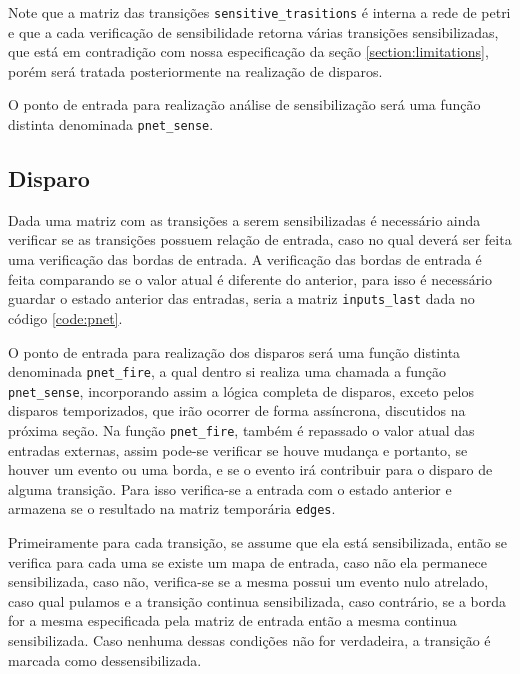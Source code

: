 Note que a matriz das transições \lstinline{sensitive_trasitions} é interna a rede de petri e que a cada verificação de sensibilidade retorna várias transições sensibilizadas, que está em contradição com nossa especificação da seção \ref{section:limitations}, porém será tratada posteriormente na realização de disparos.   

O ponto de entrada para realização análise de sensibilização será uma função distinta denominada \lstinline{pnet_sense}.

\subsection{Disparo}

Dada uma matriz com as transições a serem sensibilizadas é necessário ainda verificar se as transições possuem relação de entrada, caso no qual deverá ser feita uma verificação das bordas de entrada. A verificação das bordas de entrada é feita comparando se o valor atual é diferente do anterior, para isso é necessário guardar o estado anterior das entradas, seria a matriz \lstinline{inputs_last} dada no código \ref{code:pnet}.

O ponto de entrada para realização dos disparos será uma função distinta denominada \lstinline{pnet_fire}, a qual dentro si realiza uma chamada a função \lstinline{pnet_sense}, incorporando assim a lógica completa de disparos, exceto pelos disparos temporizados, que irão ocorrer de forma assíncrona, discutidos na próxima seção. Na função \lstinline{pnet_fire}, também é repassado o valor atual das entradas externas, assim pode-se verificar se houve mudança e portanto, se houver um evento ou uma borda, e se o evento irá contribuir para o disparo de alguma transição. Para isso verifica-se a entrada com o estado anterior e armazena se o resultado na matriz temporária \lstinline{edges}. 



Primeiramente para cada transição, se assume que ela está sensibilizada, então se verifica para cada uma se existe um mapa de entrada, caso não ela permanece sensibilizada, caso não, verifica-se se a mesma possui um evento nulo atrelado, caso qual pulamos e a transição continua sensibilizada, caso contrário, se a borda for a mesma especificada pela matriz de entrada então a mesma continua sensibilizada. Caso nenhuma dessas condições não for verdadeira, a transição é marcada como dessensibilizada.   

